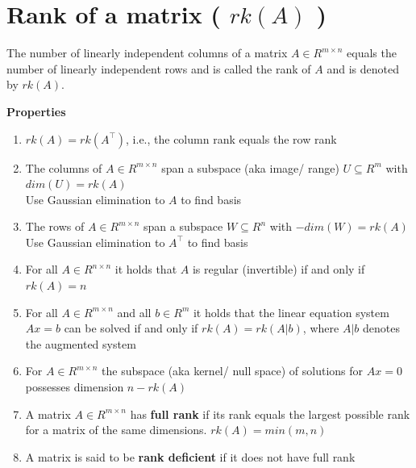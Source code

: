 \section{Rank of a matrix ( $rk(A)$ )}\label{Rank of a matrix}
The number of linearly independent columns of a matrix $A \in  R^{m\times n}$ equals the number of linearly independent rows and is called the rank of $A$ and is denoted by $rk(A)$.

\vspace{0.2cm}
\noindent\textbf{Properties}
\begin{enumerate}
    \item $rk(A) = rk(A^\top )$, i.e., the column rank equals the row rank

    \item The columns of $A \in  R^{m\times n}$ span a subspace (aka image/ range) $U \subseteq R^m$ with $dim(U) = rk(A)$\\
    Use Gaussian elimination to $A$ to find basis
    
    \item The rows of $A \in  R^{m\times n}$ span a subspace $W \subseteq R^n$ with $-dim(W) = rk(A)$\\
    Use Gaussian elimination to $A^\top$ to find basis
    
    \item For all $A \in  R^{n\times n}$ it holds that $A$ is regular (invertible) if and only if $rk(A) = n$
    
    \item For all $A \in  R^{m\times n}$ and all $b \in  R^m$ it holds that the linear equation system $Ax = b$ can be solved if and only if $rk(A) = rk(A|b)$, where $A|b$ denotes the augmented system
    
    \item For $A \in  R^{m\times n}$ the subspace (aka kernel/ null space) of solutions for $Ax = 0$ possesses dimension $n - rk(A)$
    
    \item A matrix $A \in  R^{m\times n}$ has \textbf{full rank} if its rank equals the largest possible rank for a matrix of the same dimensions. $rk(A) = min(m, n)$
    
    \item A matrix is said to be \textbf{rank deficient} if it does not have full rank
\end{enumerate}

